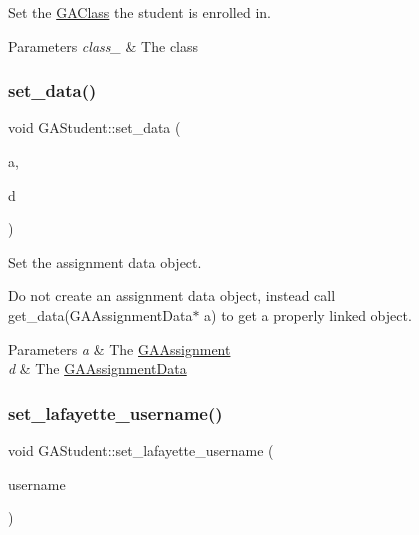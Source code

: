 Set the \hyperlink{class_g_a_class}{G\+A\+Class} the student is enrolled in. 


\begin{DoxyParams}{Parameters}
{\em class\+\_\+} & The class \\
\hline
\end{DoxyParams}
\mbox{\label{class_g_a_student_a4cc7c39cf2d032023e6cd5e6313152c7}} 
\subsubsection{\texorpdfstring{set\+\_\+data()}{set\_data()}}
{\footnotesize\ttfamily void G\+A\+Student\+::set\+\_\+data (\begin{DoxyParamCaption}\item[{\hyperlink{class_g_a_assignment}{G\+A\+Assignment} $\ast$}]{a,  }\item[{\hyperlink{class_g_a_assignment_data}{G\+A\+Assignment\+Data} $\ast$}]{d }\end{DoxyParamCaption})}



Set the assignment data object. 

Do not create an assignment data object, instead call get\+\_\+data(\+G\+A\+Assignment\+Data$\ast$ a) to get a properly linked object.


\begin{DoxyParams}{Parameters}
{\em a} & The \hyperlink{class_g_a_assignment}{G\+A\+Assignment} \\
\hline
{\em d} & The \hyperlink{class_g_a_assignment_data}{G\+A\+Assignment\+Data} \\
\hline
\end{DoxyParams}
\mbox{\label{class_g_a_student_a996265e95742082a4f762b2fe6022c65}} 
\subsubsection{\texorpdfstring{set\+\_\+lafayette\+\_\+username()}{set\_lafayette\_username()}}
{\footnotesize\ttfamily void G\+A\+Student\+::set\+\_\+lafayette\+\_\+username (\begin{DoxyParamCaption}\item[{std\+::string}]{username }\end{DoxyParamCaption})}



